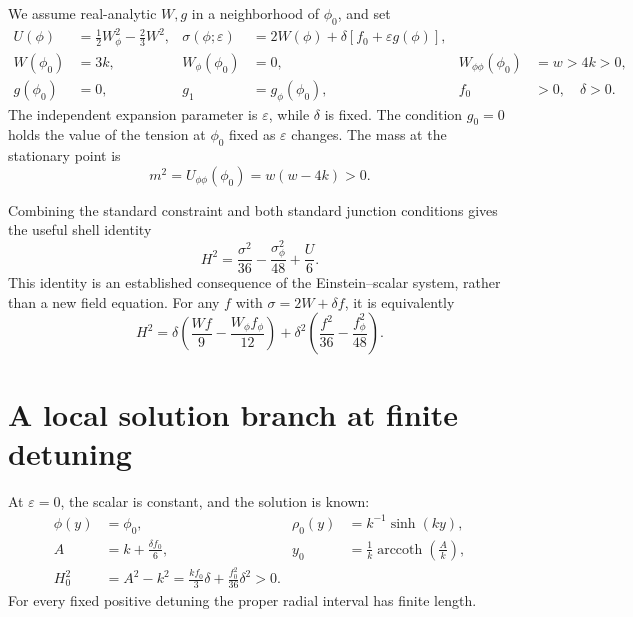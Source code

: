 \documentclass[11pt]{article}
\newcommand{\eps}{\varepsilon}
\begin{document}
We assume real-analytic $W,g$ in a neighborhood of $\phi_0$, and set
\begin{align}
U(\phi)&=\tfrac12 W_\phi^2-\tfrac23 W^2,
&\sigma(\phi;\eps)&=2W(\phi)+\delta[f_0+\eps g(\phi)],\label{eq:model}\\
W(\phi_0)&=3k,&W_\phi(\phi_0)&=0,
&W_{\phi\phi}(\phi_0)&=w>4k>0,\label{eq:hypotheses}\\
g(\phi_0)&=0,&g_1&=g_\phi(\phi_0),
&f_0&>0,\quad\delta>0.\nonumber
\end{align}
The independent expansion parameter is $\eps$, while $\delta$ is fixed. The condition $g_0=0$ holds the value of the tension at $\phi_0$ fixed as $\eps$ changes. The mass at the stationary point is
\begin{equation}
m^2=U_{\phi\phi}(\phi_0)=w(w-4k)>0.
\end{equation}

Combining the standard constraint and both standard junction conditions gives the useful shell identity
\begin{equation}
H^2=\frac{\sigma^2}{36}-\frac{\sigma_\phi^2}{48}+\frac{U}{6}.
\label{eq:shellidentity}
\end{equation}
This identity is an established consequence of the Einstein--scalar system, rather than a new field equation. For any $f$ with $\sigma=2W+\delta f$, it is equivalently
\begin{equation}
H^2=\delta\left(\frac{Wf}{9}-\frac{W_\phi f_\phi}{12}\right)
+\delta^2\left(\frac{f^2}{36}-\frac{f_\phi^2}{48}\right).
\label{eq:cancelledidentity}
\end{equation}

\section{A local solution branch at finite detuning}
At $\eps=0$, the scalar is constant, and the solution is known:
\begin{align}
\phi(y)&=\phi_0,&\rho_0(y)&=k^{-1}\sinh(ky),\nonumber\\
A&=k+\frac{\delta f_0}{6},&
y_0&=\frac{1}{k}\operatorname{arccoth}\!\left(\frac{A}{k}\right),\label{eq:base}\\
H_0^2&=A^2-k^2
=\frac{kf_0}{3}\delta+\frac{f_0^2}{36}\delta^2>0.\nonumber
\end{align}
For every fixed positive detuning the proper radial interval has finite length.
\end{document}
